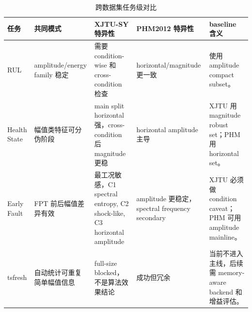 \begin{table}[htbp]
\centering
\caption{跨数据集任务级对比}
\label{tab:cross_dataset_task_comparison}
\scriptsize
\begin{tabularx}{\textwidth}{lYYYY}
\toprule
任务 & 共同模式 & XJTU-SY 特异性 & PHM2012 特异性 & baseline 含义 \\
\midrule
RUL & amplitude/energy family 稳定 & 需要 condition-wise 和 cross-condition 检查 & horizontal/magnitude 更一致 & 使用  amplitude compact subset。\\
Health State & 幅值类特征可分伪阶段 & main split horizontal 强，cross-condition 后 magnitude 更稳 & horizontal amplitude 主导 & XJTU 用 magnitude robust set；PHM 用 horizontal set。\\
Early Fault & FPT 前后幅值差异有效 & 最工况敏感，C1 spectral entropy, C2 shock-like, C3 horizontal amplitude & amplitude 更稳定，spectral frequency secondary & XJTU 必须做 condition caveat；PHM 可用 amplitude mainline。\\
tsfresh & 自动统计可重复简单幅值信息 & full-size blocked，不是算法效果结论 & 成功但冗余 & 当前不进入主线，后续需 memory-aware backend 和增益评估。\\
\bottomrule
\end{tabularx}
\end{table}
